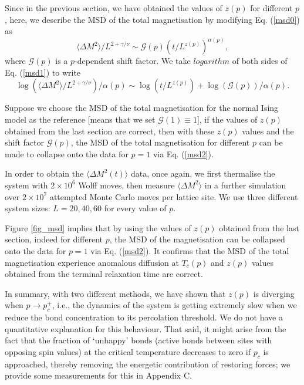 \documentclass[12pt,nofootinbib,aps,amsmath,amssymb,preprint,showpacs]{revtex4}
\begin{document}
Since in the previous section, we have obtained the values of $z(p)$
for different $p$, here, we describe the MSD of the total
magnetisation by modifying Eq. (\ref{msd0}) as
\begin{equation}
\langle \Delta M^2\rangle / L^{2+\gamma/\nu}\sim \mathcal{G}(p)\left(t/L^{z(p)}\right)^{\alpha(p)},
\label{msd1}
\end{equation}
where $\mathcal{G}(p)$ is a $p$-dependent shift factor. We
take $logarithm$ of both sides of Eq. (\ref{msd1}) to write
\begin{equation}
\log\left( \langle \Delta M^2\rangle / L^{2+\gamma/\nu}\right)/\alpha(p) \sim \log\left( t/L^{z(p)}\right)+\log\left( \mathcal{G}(p)\right)/\alpha(p).
\label{msd2}
\end{equation}

Suppose we choose the MSD of the total magnetisation for the normal
Ising model as the reference [means that we set $\mathcal{G}(1)\equiv
  1$], if the values of $z(p)$ obtained from the last section are
correct, then with these $z(p)$ values and the shift factor ${\mathcal
  G}(p)$, the MSD of the total magnetisation for different $p$ can be
made to collapse onto the data for $p=1$ via Eq. (\ref{msd2}).

In order to obtain the $\langle\Delta M^2(t)\rangle$ data, once again,
we first thermalise the system with $2 \times 10^6$ Wolff moves, then
measure $\langle \Delta M^2\rangle$ in a further simulation over $2
\times 10^7$ attempted Monte Carlo moves per lattice site. We use
three different system sizes: $L = 20, 40, 60$ for every value of $p$.
 
Figure \ref{fig_msd} implies that by using the values of $z(p)$
obtained from the last section, indeed for different $p$, the MSD of
the magnetisation can be collapsed onto the data for $p=1$ via
Eq. (\ref{msd2}). It confirms that the MSD of the total magnetisation
experience anomalous diffusion at $T_c(p)$ and $z(p)$ values obtained
from the terminal relaxation time are correct.
  
In summary, with two different methods, we have shown that $z(p)$ is
diverging when $p\rightarrow p_c^+$, i.e., the dynamics of the system
is getting extremely slow when we reduce the bond concentration to its
percolation threshold.  We do not have a quantitative explanation for
this behaviour. That said, it might arise from the fact that the
fraction of `unhappy' bonds (active bonds between sites with opposing
spin values) at the critical temperature decreases to zero if $p_c$ is
approached, thereby removing the energetic contribution of restoring
forces; we provide some measurements for this in Appendix C.
\end{document}
